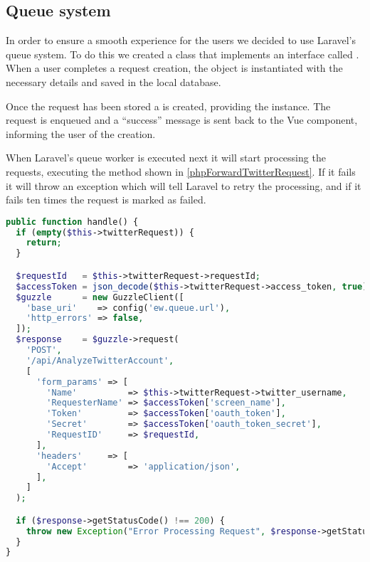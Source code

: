 \subsection{Queue system} \label{sub:gui-queue}
In order to ensure a smooth experience for the users we decided to use Laravel's
queue system. To do this we created a  class that
implements an interface called . When a user completes a
request creation, the  object is instantiated with the
necessary details and saved in the local database.\nl

Once the request has been stored a  is
created, providing the  instance. The request is enqueued and a
``success'' message is sent back to the Vue component, informing the user of the
creation.\nl

When Laravel's queue worker is executed next it will start processing the
requests, executing the  method shown in
\autoref{phpForwardTwitterRequest}. If it fails it will throw an exception which
will tell Laravel to retry the processing, and if it fails ten times the request
is marked as failed.\nl

\begin{minipage}[H]{\linewidth}
\begin{lstlisting}[caption = Handle method of the ForwardTwitterRequest class,
label = phpForwardTwitterRequest, language = PHP, style = PHP]
public function handle() {
  if (empty($this->twitterRequest)) {
    return;
  }

  $requestId   = $this->twitterRequest->requestId;
  $accessToken = json_decode($this->twitterRequest->access_token, true);
  $guzzle      = new GuzzleClient([
    'base_uri'    => config('ew.queue.url'),
    'http_errors' => false,
  ]);
  $response    = $guzzle->request(
    'POST',
    '/api/AnalyzeTwitterAccount',
    [
      'form_params' => [
        'Name'          => $this->twitterRequest->twitter_username,
        'RequesterName' => $accessToken['screen_name'],
        'Token'         => $accessToken['oauth_token'],
        'Secret'        => $accessToken['oauth_token_secret'],
        'RequestID'     => $requestId,
      ],
      'headers'     => [
        'Accept'        => 'application/json',
      ],
    ]
  );

  if ($response->getStatusCode() !== 200) {
    throw new Exception("Error Processing Request", $response->getStatusCode());
  }
}
\end{lstlisting}
\end{minipage}

